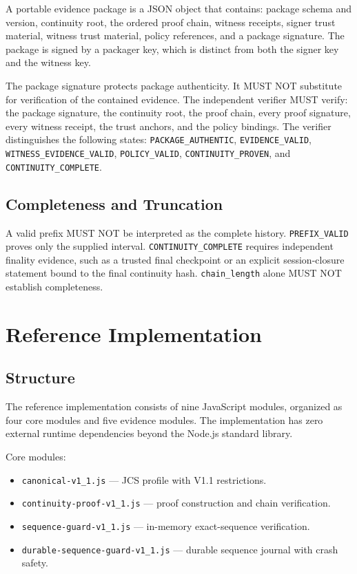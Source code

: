 \documentclass[11pt,a4paper]{article}
\begin{document}
A portable evidence package is a JSON object that contains: package schema and version, continuity root, the ordered proof chain, witness receipts, signer trust material, witness trust material, policy references, and a package signature. The package is signed by a packager key, which is distinct from both the signer key and the witness key.

The package signature protects package authenticity. It MUST NOT substitute for verification of the contained evidence. The independent verifier MUST verify: the package signature, the continuity root, the proof chain, every proof signature, every witness receipt, the trust anchors, and the policy bindings. The verifier distinguishes the following states: \texttt{PACKAGE\_AUTHENTIC}, \texttt{EVIDENCE\_VALID}, \texttt{WITNESS\_EVIDENCE\_VALID}, \texttt{POLICY\_VALID}, \texttt{CONTINUITY\_PROVEN}, and \texttt{CONTINUITY\_COMPLETE}.

\subsection{Completeness and Truncation}

A valid prefix MUST NOT be interpreted as the complete history. \texttt{PREFIX\_VALID} proves only the supplied interval. \texttt{CONTINUITY\_COMPLETE} requires independent finality evidence, such as a trusted final checkpoint or an explicit session-closure statement bound to the final continuity hash. \texttt{chain\_length} alone MUST NOT establish completeness.

\section{Reference Implementation}

\subsection{Structure}

The reference implementation consists of nine JavaScript modules, organized as four core modules and five evidence modules. The implementation has zero external runtime dependencies beyond the Node.js standard library.

Core modules:

\begin{itemize}
\item \texttt{canonical-v1\_1.js} --- JCS profile with V1.1 restrictions.
\item \texttt{continuity-proof-v1\_1.js} --- proof construction and chain verification.
\item \texttt{sequence-guard-v1\_1.js} --- in-memory exact-sequence verification.
\item \texttt{durable-sequence-guard-v1\_1.js} --- durable sequence journal with crash safety.
\end{itemize}
\end{document}
